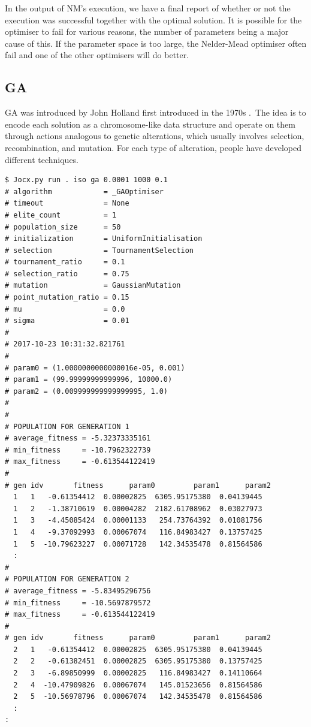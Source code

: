 \documentclass[graybox]{svmult}
\begin{document}
In the output of NM's execution, we have a final report of whether or not the execution was successful together with the optimal solution. It is possible for the optimiser to fail for various reasons, the number of parameters being a major cause of this. If the parameter space is too large, the Nelder-Mead optimiser often fail and one of the other optimisers will do better.

\subsection{GA}

GA was introduced by John Holland first introduced in the 1970s \cite{holland1992genetic}.\ The idea is to encode each solution as a chromosome-like data structure and operate on them through actions analogous to genetic alterations, which usually involves selection, recombination, and mutation. For each type of alteration, people have developed different techniques.

 {\scriptsize{}\begin{verbatim}
$ Jocx.py run . iso ga 0.0001 1000 0.1
# algorithm            = _GAOptimiser
# timeout              = None
# elite_count          = 1
# population_size      = 50
# initialization       = UniformInitialisation
# selection            = TournamentSelection
# tournament_ratio     = 0.1
# selection_ratio      = 0.75
# mutation             = GaussianMutation
# point_mutation_ratio = 0.15
# mu                   = 0.0
# sigma                = 0.01
#
# 2017-10-23 10:31:32.821761
#
# param0 = (1.0000000000000016e-05, 0.001)
# param1 = (99.99999999999996, 10000.0)
# param2 = (0.009999999999999995, 1.0)
#
#
# POPULATION FOR GENERATION 1
# average_fitness = -5.32373335161
# min_fitness     = -10.7962322739
# max_fitness     = -0.613544122419
#
# gen idv       fitness      param0         param1      param2
  1   1   -0.61354412  0.00002825  6305.95175380  0.04139445
  1   2   -1.38710619  0.00004282  2182.61708962  0.03027973
  1   3   -4.45085424  0.00001133   254.73764392  0.01081756
  1   4   -9.37092993  0.00067074   116.84983427  0.13757425
  1   5  -10.79623227  0.00071728   142.34535478  0.81564586
  :
#
# POPULATION FOR GENERATION 2
# average_fitness = -5.83495296756
# min_fitness     = -10.5697879572
# max_fitness     = -0.613544122419
#
# gen idv       fitness      param0         param1      param2
  2   1   -0.61354412  0.00002825  6305.95175380  0.04139445
  2   2   -0.61382451  0.00002825  6305.95175380  0.13757425
  2   3   -6.89850999  0.00002825   116.84983427  0.14110664
  2   4  -10.47909826  0.00067074   145.01523656  0.81564586
  2   5  -10.56978796  0.00067074   142.34535478  0.81564586
  :
:
\end{verbatim}}
\end{document}
